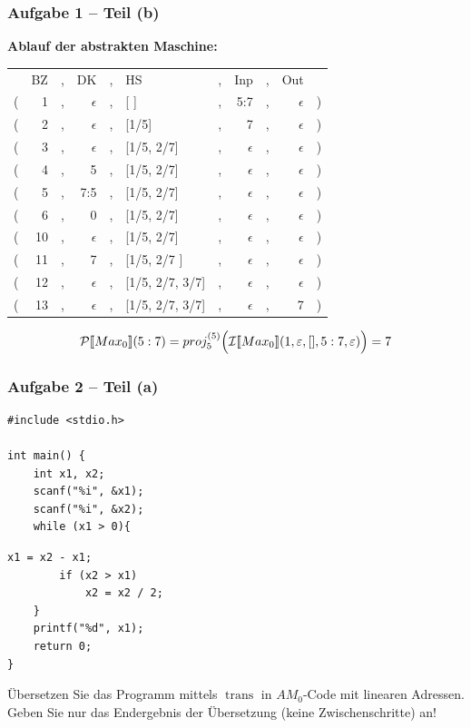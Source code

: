 \documentclass{beamer}
\renewcommand{\emph}[1]{\textbf{#1}}
\DeclareMathOperator{\trans}{trans}
\begin{document}
\begin{frame} \frametitle{Aufgabe 1 -- Teil (b)}
	\small
	\emph{Ablauf der abstrakten Maschine:} 
	\begin{center}
		\begin{tabular}{rrcrclcrcrl}
			& BZ &,& DK &,& HS &,& Inp &,& Out & \\
			( & 1 &,& $\epsilon$ &,& [ ] &,& 5:7 &,& $\epsilon$ & ) \\
			( & 2 &,& $\epsilon$ &,& [1/5] &,& 7 &,& $\epsilon$ & ) \\
			( & 3 &,& $\epsilon$ &,& [1/5, 2/7] &,& $\epsilon$ &,& $\epsilon$ & ) \\
			( & 4 &,& 5 &,& [1/5, 2/7] &,& $\epsilon$ &,& $\epsilon$ & ) \\
			( & 5 &,& 7:5 &,& [1/5, 2/7] &,& $\epsilon$ &,& $\epsilon$ & ) \\
			( & 6 &,& 0 &,& [1/5, 2/7] &,& $\epsilon$ &,& $\epsilon$ & ) \\
			( & 10 &,& $\epsilon$ &,& [1/5, 2/7] &,& $\epsilon$ &,& $\epsilon$ & ) \\
			( & 11 &,& 7 &,& [1/5, 2/7 ] &,& $\epsilon$ &,& $\epsilon$ & ) \\
			( & 12 &,& $\epsilon$ &,& [1/5, 2/7, 3/7] &,& $\epsilon$ &,& $\epsilon$ & ) \\
			( & 13 &,& $\epsilon$ &,& [1/5, 2/7, 3/7] &,& $\epsilon$ &,& 7 & ) \\
		\end{tabular}
	\end{center}
	
	\pause   		
	
	\begin{equation*}
	\mathcal{P} [\![ Max_0 ]\!] (5:7) = proj_5^{(5)} \Bigl( \mathcal{I}[\![ Max_0 ]\!] (1,\epsilon, [],5:7,\epsilon) \Bigr) = 7
	\end{equation*}
\end{frame}
%

\begin{frame}[fragile] \frametitle{Aufgabe 2 -- Teil (a)}
	\begin{minipage}{\dimexpr0.5\linewidth-\fboxrule-\fboxsep}
		\begin{lstlisting}
#include <stdio.h> 

int main() { 
	int x1, x2;
	scanf("%i", &x1); 
	scanf("%i", &x2); 
	while (x1 > 0){
		\end{lstlisting}
	\end{minipage}
	\begin{minipage}{\dimexpr0.5\linewidth-\fboxrule-\fboxsep}
		\begin{lstlisting}[firstnumber=8]
		x1 = x2 - x1; 
		if (x2 > x1)
			x2 = x2 / 2;
	}
	printf("%d", x1); 
	return 0;
}
		\end{lstlisting}
	\end{minipage}

	\bigskip
	
	Übersetzen Sie das Programm mittels $\trans$ in $AM_0$-Code mit linearen Adressen. Geben Sie nur das Endergebnis der Übersetzung (keine Zwischenschritte) an!
\end{frame}
\end{document}
